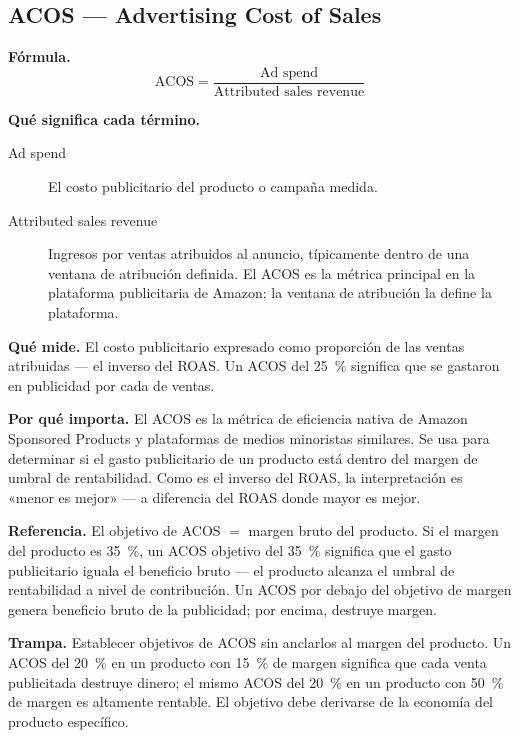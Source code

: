 \subsection{ACOS --- Advertising Cost of Sales}

\textbf{Fórmula.}
\[
  \mathrm{ACOS} = \frac{\text{Ad spend}}{\text{Attributed sales revenue}}
\]

\textbf{Qué significa cada término.}
\begin{description}
  \item[Ad spend] El costo publicitario del producto o campaña medida.
  \item[Attributed sales revenue] Ingresos por ventas atribuidos al anuncio, típicamente
    dentro de una ventana de atribución definida. El ACOS es la métrica principal en la
    plataforma publicitaria de Amazon; la ventana de atribución la define la plataforma.
\end{description}

\textbf{Qué mide.} El costo publicitario expresado como proporción de las ventas atribuidas
--- el inverso del ROAS. Un ACOS del \qty{25}{\percent} significa que se gastaron 
en publicidad por cada  de ventas.

\textbf{Por qué importa.} El ACOS es la métrica de eficiencia nativa de Amazon Sponsored
Products y plataformas de medios minoristas similares. Se usa para determinar si el gasto
publicitario de un producto está dentro del margen de umbral de rentabilidad. Como es el
inverso del ROAS, la interpretación es «menor es mejor» --- a diferencia del ROAS donde
mayor es mejor.

\textbf{Referencia.} El objetivo de ACOS $=$ margen bruto del producto. Si el margen del
producto es \qty{35}{\percent}, un ACOS objetivo del \qty{35}{\percent} significa que el
gasto publicitario iguala el beneficio bruto --- el producto alcanza el umbral de
rentabilidad a nivel de contribución. Un ACOS por debajo del objetivo de margen genera
beneficio bruto de la publicidad; por encima, destruye margen.

\textbf{Trampa.} Establecer objetivos de ACOS sin anclarlos al margen del producto. Un ACOS
del \qty{20}{\percent} en un producto con \qty{15}{\percent} de margen significa que cada
venta publicitada destruye dinero; el mismo ACOS del \qty{20}{\percent} en un producto con
\qty{50}{\percent} de margen es altamente rentable. El objetivo debe derivarse de la economía
del producto específico.

